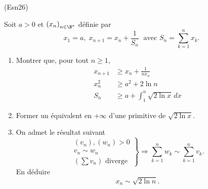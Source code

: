 \begin{tiny}(Esn26)\end{tiny} Soit $a>0$ et $\left( x_n \right)_{n \in \N^*}$ définie par
\[
 x_1 = a, \; x_{n+1} = x_n + \frac{1}{S_n}\; \text{ avec }
 S_n = \sum_{k=1}^n x_k.
\]
\begin{enumerate}
 \item Montrer que, pour tout $n \geq 1$,
\begin{align}
x_{n+1} &\geq x_n + \frac{1}{nx_n} \\
x_{n}^2 &\geq a^2 + 2 \ln n \\
S_n &\geq a + \int_1^n \sqrt{2 \ln x}\,dx
\end{align}
 \item Former un équivalent en $+\infty$ d'une primitive de $\sqrt{2 \ln x}$. 
 \item On admet le résultat suivant
\[
\left. 
\begin{aligned}
 (v_n), (w_n) > 0\\
 v_n \sim w_n\\
 (\sum v_n) \text{ diverge}
\end{aligned}
\right\rbrace \Rightarrow 
\sum_{k=1}^n w_k \sim \sum_{k=1}^n v_k.
\]
En déduire
 \[
 x_n \sim \sqrt{2 \ln n}.
\]
\end{enumerate}
